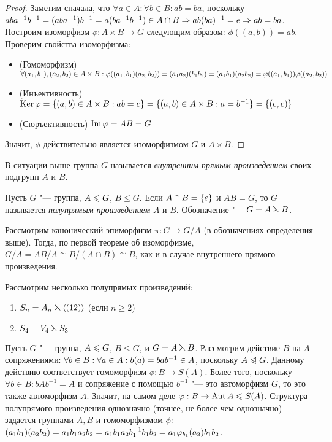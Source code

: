 \begin{proof}
	Заметим сначала, что $\forall a \in A: \forall b \in B: ab = ba$, поскольку $aba^{-1}b^{-1} \hm= (aba^{-1})b^{-1} = a(ba^{-1}b^{-1}) \in A \cap B \ra ab(ba)^{-1} \hm= e \ra ab = ba$. Построим изоморфизм $\phi: A \times B \to G$ следующим образом: $\phi((a, b)) = ab$. Проверим свойства изоморфизма:
	\begin{itemize}
		\item (Гомоморфизм) $\forall (a_1, b_1), (a_2, b_2) \in A \times B: \phi((a_1, b_1)(a_2, b_2)) \hm= (a_1a_2)(b_1b_2) \hm= (a_1b_1)(a_2b_2) = \phi((a_1, b_1))\phi((a_2, b_2))$
		\item (Инъективность) $\ke\phi = \{(a, b) \in A \times B: ab = e\} = \{(a, b) \hm\in A \times B: a = b^{-1}\} \hm= \{(e, e)\}$
		\item (Сюръективность) $\operatorname{Im}\varphi = AB = G$
	\end{itemize}
	
	Значит, $\phi$ действительно является изоморфизмом $G$ и $A \times B$.
\end{proof}

\begin{note}
	В ситуации выше группа $G$ называется \textit{внутренним прямым произведением} своих подгрупп $A$ и $B$.
\end{note}

\begin{definition}
	Пусть $G$ "--- группа, $A \trianglelefteqslant G$, $B \le G$. Если $A \cap B \hm= \{e\}$ и $AB = G$, то $G$ называется \textit{полупрямым произведением} $A$ и $B$. Обозначение "--- $G = A \leftthreetimes B$.
\end{definition}

\begin{note}
	Рассмотрим канонический эпиморфизм $\pi: G \to G/A$ (в обозначениях определения выше). Тогда, по первой теореме об изоморфизме, $G / A = AB/A \cong B / (A \cap B) \cong B$, как и в случае внутреннего прямого произведения.
\end{note}

\begin{example} Рассмотрим несколько полупрямых произведений:
	\begin{enumerate}
		\item $S_n = A_n \leftthreetimes \langle(12)\rangle$ (если $n \ge 2$)
		\item $S_4 = V_4 \leftthreetimes S_3$
	\end{enumerate}
\end{example}

\begin{note}
	Пусть $G$ "--- группа, $A \trianglelefteqslant G$, $B \le G$, и $G = A \leftthreetimes B$. Рассмотрим действие $B$ на $A$ сопряжениями: $\forall b \in B: \forall a \in A: b(a) \hm= bab^{-1} \in A$, поскольку $A \trianglelefteqslant G$. Данному действию соответствует гомоморфизм $\phi: B \to S(A)$. Более того, поскольку $\forall b \in B: bAb^{-1} = A$ и сопряжение с помощью $b^{-1}$ "--- это автоморфизм $G$, то это также автоморфизм $A$. Значит, на самом деле $\varphi: B \to \operatorname{Aut}{A} \leqslant S(A)$. Структура полупрямого произведения однозначно (точнее, не более чем однозначно) задается группами $A, B$ и гомоморфизмом $\phi$: $(a_1b_1)(a_2b_2) \hm= a_1b_1a_2b_2 = a_1b_1a_2b_1^{-1}b_1b_2 = a_1\phi_{b_1}(a_2)b_1b_2$.
\end{note}

